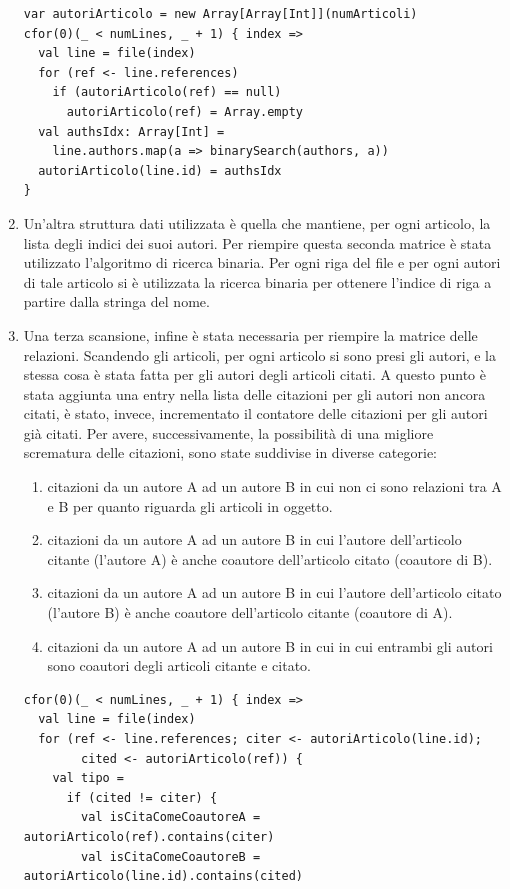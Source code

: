 \documentclass[a4paper, 12pt]{article}
\begin{document}
\begin{enumerate}
\begin{lstlisting}[keepspaces=true]
var autoriArticolo = new Array[Array[Int]](numArticoli)
cfor(0)(_ < numLines, _ + 1) { index =>
  val line = file(index)
  for (ref <- line.references)
    if (autoriArticolo(ref) == null)
      autoriArticolo(ref) = Array.empty
  val authsIdx: Array[Int] =
    line.authors.map(a => binarySearch(authors, a))
  autoriArticolo(line.id) = authsIdx
}
  \end{lstlisting}
  \item Un'altra struttura dati utilizzata è quella che mantiene, per ogni articolo, la lista degli indici dei suoi autori. Per riempire questa seconda matrice è stata utilizzato l'algoritmo di ricerca binaria.
  Per ogni riga del file e per ogni autori di tale articolo si è utilizzata la ricerca binaria per ottenere l'indice di riga a partire dalla stringa del nome.
  \item Una terza scansione, infine è stata necessaria per riempire la matrice delle relazioni. Scandendo gli articoli, per ogni articolo si sono presi gli autori, e la stessa cosa è stata fatta per gli autori degli articoli citati. A questo punto è stata aggiunta una entry nella lista delle citazioni per gli autori non ancora citati, è stato, invece, incrementato il contatore delle citazioni per gli autori già citati. Per avere, successivamente, la possibilità di una migliore scrematura delle citazioni, sono state suddivise in diverse categorie:
  \begin{enumerate}
    \item citazioni da un autore A ad un autore B in cui non ci sono relazioni tra A e B per quanto riguarda gli articoli in oggetto.
    \item citazioni da un autore A ad un autore B in cui l'autore dell'articolo citante (l'autore A) è anche coautore dell'articolo citato (coautore di B).
    \item citazioni da un autore A ad un autore B in cui l'autore dell'articolo citato (l'autore B) è anche coautore dell'articolo citante (coautore di A).
    \item citazioni da un autore A ad un autore B in cui in cui entrambi gli autori sono coautori degli articoli citante e citato. 
  \end{enumerate}
  \begin{lstlisting}[keepspaces=true]
cfor(0)(_ < numLines, _ + 1) { index =>
  val line = file(index)
  for (ref <- line.references; citer <- autoriArticolo(line.id);
        cited <- autoriArticolo(ref)) {
    val tipo =
      if (cited != citer) {
        val isCitaComeCoautoreA = autoriArticolo(ref).contains(citer)
        val isCitaComeCoautoreB = autoriArticolo(line.id).contains(cited)


\end{lstlisting}
\end{enumerate}
\end{document}
